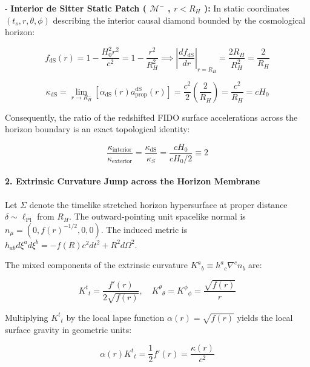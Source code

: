 \documentclass[11pt,a4paper]{article}
\theoremstyle{definition}\newtheorem{definition}{Definition}
\theoremstyle{remark}\newtheorem{remark}{Remark}
\begin{document}
- \textbf{Interior de Sitter Static Patch ( $\mathcal{M}^-$ , $r < R_H$ ):}
In static coordinates $(t_s, r, \theta, \phi)$ describing the interior causal diamond bounded by the cosmological horizon:


\begin{equation}
f_{\text{dS}}(r) = 1 - \frac{H_0^2 r^2}{c^2} = 1 - \frac{r^2}{R_H^2} \implies \left| \frac{df_{\text{dS}}}{dr} \right|_{r = R_H} = \frac{2 R_H}{R_H^2} = \frac{2}{R_H}
\end{equation}



\begin{equation}
\kappa_{\text{dS}} = \lim_{r \to R_H^-} \left[ \alpha_{\text{dS}}(r) a_{\text{prop}}^{\text{dS}}(r) \right] = \frac{c^2}{2} \left(\frac{2}{R_H}\right) = \frac{c^2}{R_H} = c H_0
\end{equation}


Consequently, the ratio of the redshifted FIDO surface accelerations across the horizon boundary is an exact topological identity:


\begin{equation}
\frac{\kappa_{\text{interior}}}{\kappa_{\text{exterior}}} = \frac{\kappa_{\text{dS}}}{\kappa_S} = \frac{c H_0}{c H_0 / 2} \equiv 2
\end{equation}

\paragraph{2. Extrinsic Curvature Jump across the Horizon Membrane}

Let $\Sigma$ denote the timelike stretched horizon hypersurface at proper distance $\delta \sim \ell_{\text{Pl}}$ from $R_H$. The outward-pointing unit spacelike normal is $n_\mu = (0, f(r)^{-1/2}, 0, 0)$. The induced metric is $h_{ab} d\xi^a d\xi^b = -f(R) c^2 dt^2 + R^2 d\Omega^2$.

The mixed components of the extrinsic curvature $K^a{}_b \equiv h^a{}_c \nabla^c n_b$ are:


\begin{equation}
K^t{}_t = \frac{f'(r)}{2\sqrt{f(r)}}, \quad K^\theta{}_\theta = K^\phi{}_\phi = \frac{\sqrt{f(r)}}{r}
\end{equation}


Multiplying $K^t{}_t$ by the local lapse function $\alpha(r) = \sqrt{f(r)}$ yields the local surface gravity in geometric units:


\begin{equation}
\alpha(r) K^t{}_t = \frac{1}{2} f'(r) = \frac{\kappa(r)}{c^2}
\end{equation}
\end{document}
